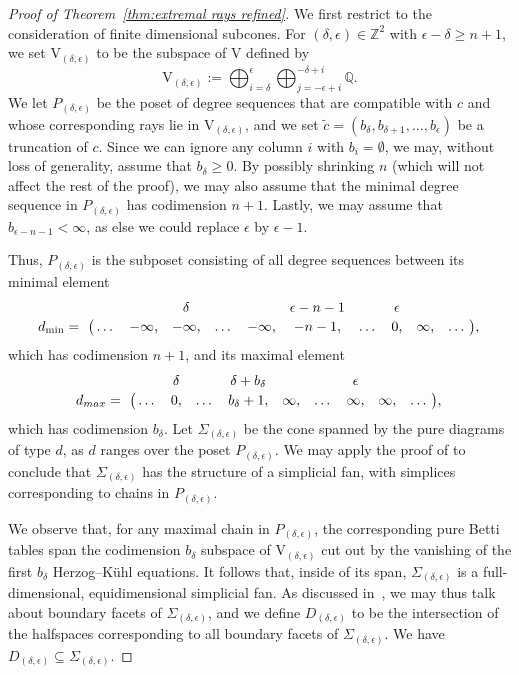 \documentclass[12pt]{amsart}
\theoremstyle{definition}
\theoremstyle{remark}
\newcommand{\ZZ}{\mathbb{Z}}
\newcommand{\QQ}{\mathbb{Q}}
\newcommand{\VV}{\mathrm{V}}
\newcommand{\cc}{c}
\newcommand{\dd}{d}
\newcommand{\nothing}{\emptyset}
\begin{document}
\begin{proof}[Proof of Theorem~\ref{thm:extremal rays refined}]
We first restrict to the consideration of finite dimensional subcones.  For $(\delta,\epsilon)\in \ZZ^2$ with $\epsilon-\delta\geq n+1$, we set $\VV_{(\delta,\epsilon)}$ to be the subspace of $\VV$ defined by
\[
\VV_{(\delta,\epsilon)}:=\bigoplus_{i=\delta}^\epsilon \bigoplus_{j=-\epsilon +i}^{-\delta+i} \QQ.
\]
We let $P_{(\delta,\epsilon)}$ be the poset of degree sequences that are compatible with $\cc$ and whose corresponding rays lie in $\VV_{(\delta,\epsilon)}$, and we set $\widetilde{\cc}=(b_{\delta},b_{\delta+1},\dots, b_{\epsilon})$ be a truncation of $\cc$.  Since we can ignore any column $i$ with $b_i=\nothing$, we may, without loss of generality, assume that $b_\delta \geq 0$.  By possibly shrinking $n$ (which will not affect the rest of the proof), we may also assume that the minimal degree sequence in $P_{(\delta,\epsilon)}$ has codimension $n+1$.  Lastly, we may assume that $b_{\epsilon-n-1}<\infty$, as else we could replace $\epsilon$ by $\epsilon-1$.

Thus, $P_{(\delta,\epsilon)}$ is the subposet consisting of all degree sequences between its minimal element 
\[\bordermatrix{&&&\delta&&&\epsilon-n-1&&\epsilon &&\cr
              d_{\min}= &\dots&-\infty,&-\infty,&\dots&-\infty,&-n-1,&\dots &0, &\infty,&\dots\cr},
              \]
              which has codimension $n+1$, and its maximal element
\[\bordermatrix{&&\delta&&\delta+b_\delta&&&\epsilon &&\cr
              d_{max}= &\dots&0,&\dots&b_{\delta}+1,&\infty,&\dots &\infty,&\infty,&\dots\cr},\]
              which has codimension $b_{\delta}$.
Let $\Sigma_{(\delta,\epsilon)}$ be the cone spanned by the pure diagrams of type $\dd$, as $\dd$ ranges over the poset $P_{(\delta,\epsilon)}$.  We may apply the proof of  \cite[Proposition~2.9]{boij-sod1} to conclude that $\Sigma_{(\delta,\epsilon)}$ has the structure of a simplicial fan, with simplices corresponding to chains in $P_{(\delta,\epsilon)}$.

We observe that, for any maximal chain in $P_{(\delta,\epsilon)}$, the corresponding pure Betti tables span the codimension $b_{\delta}$ subspace of $\VV_{(\delta,\epsilon)}$ cut out by the vanishing of the first $b_{\delta}$ Herzog--K\"uhl equations.
It follows that, inside of its span, $\Sigma_{(\delta,\epsilon)}$ is a full-dimensional, equidimensional simplicial fan.  
As discussed in~\cite[Appendix]{bbeg}, we may thus talk about boundary facets of $\Sigma_{(\delta,\epsilon)}$, and we define $D_{(\delta,\epsilon)}$ to be the intersection of the halfspaces corresponding to all boundary facets of $\Sigma_{(\delta,\epsilon)}$.  We have $D_{(\delta,\epsilon)} \subseteq \Sigma_{(\delta,\epsilon)}$.


\end{proof}
\end{document}
